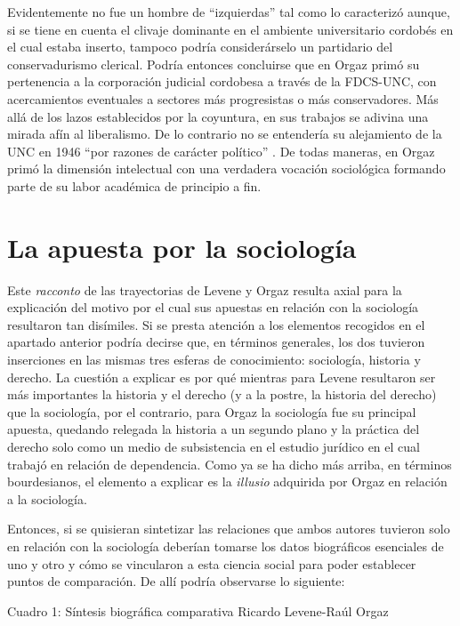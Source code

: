 Evidentemente no fue un hombre de \enquote{izquierdas} tal como lo caracterizó \textcite{1624-FERRERO1984} aunque, si se tiene en cuenta el clivaje dominante en el ambiente universitario cordobés en el cual estaba inserto, tampoco podría considerárselo un partidario del conservadurismo clerical. Podría entonces concluirse que en Orgaz primó su pertenencia a la corporación judicial cordobesa a través de la FDCS-UNC, con acercamientos eventuales a sectores más progresistas o más conservadores. Más allá de los lazos establecidos por la coyuntura, en sus trabajos se adivina una mirada afín al liberalismo. De lo contrario no se entendería su alejamiento de la UNC en 1946 \enquote{por razones de carácter político} \parencite[25]{1558-CHAMORROGRECA2007}. De todas maneras, en Orgaz primó la dimensión intelectual con una verdadera vocación sociológica formando parte de su labor académica de principio a fin.

\section{La apuesta por la sociología}

Este \emph{racconto} de las trayectorias de Levene y Orgaz resulta axial para la explicación del motivo por el cual sus apuestas en relación con la sociología resultaron tan disímiles. Si se presta atención a los elementos recogidos en el apartado anterior podría decirse que, en términos generales, los dos tuvieron inserciones en las mismas tres esferas de conocimiento: sociología, historia y derecho. La cuestión a explicar es por qué mientras para Levene resultaron ser más importantes la historia y el derecho (y a la postre, la historia del derecho) que la sociología, por el contrario, para Orgaz la sociología fue su principal apuesta, quedando relegada la historia a un segundo plano y la práctica del derecho solo como un medio de subsistencia en el estudio jurídico en el cual trabajó en relación de dependencia. Como ya se ha dicho más arriba, en términos bourdesianos, el elemento a explicar es la \emph{illusio} adquirida por Orgaz en relación a la sociología.

Entonces, si se quisieran sintetizar las relaciones que ambos autores tuvieron solo en relación con la sociología deberían tomarse los datos biográficos esenciales de uno y otro y cómo se vincularon a esta ciencia social para poder establecer puntos de comparación. De allí podría observarse lo siguiente:

Cuadro 1: Síntesis biográfica comparativa Ricardo Levene-Raúl Orgaz

